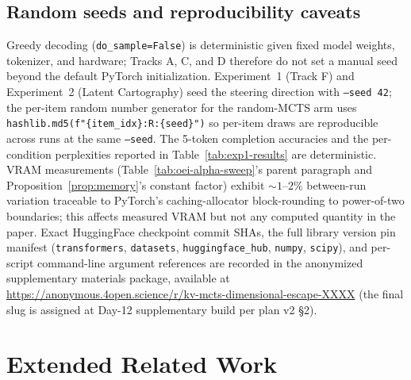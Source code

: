 \documentclass{article}
\begin{document}
\subsection{Random seeds and reproducibility caveats}
Greedy decoding (\texttt{do\_sample=False}) is deterministic given fixed model weights, tokenizer, and hardware; Tracks A, C, and D therefore do not set a manual seed beyond the default PyTorch initialization. Experiment~1 (Track F) and Experiment~2 (Latent Cartography) seed the steering direction with \texttt{--seed 42}; the per-item random number generator for the random-MCTS arm uses \texttt{hashlib.md5(f"\{item\_idx\}:R:\{seed\}")} so per-item draws are reproducible across runs at the same \texttt{--seed}. The 5-token completion accuracies and the per-condition perplexities reported in Table~\ref{tab:exp1-results} are deterministic. VRAM measurements (Table~\ref{tab:oei-alpha-sweep}'s parent paragraph and Proposition~\ref{prop:memory}'s constant factor) exhibit ${\sim}1$--$2\%$ between-run variation traceable to PyTorch's caching-allocator block-rounding to power-of-two boundaries; this affects measured VRAM but not any computed quantity in the paper. Exact HuggingFace checkpoint commit SHAs, the full library version pin manifest (\texttt{transformers}, \texttt{datasets}, \texttt{huggingface\_hub}, \texttt{numpy}, \texttt{scipy}), and per-script command-line argument references are recorded in the anonymized supplementary materials package, available at \url{https://anonymous.4open.science/r/kv-mcts-dimensional-escape-XXXX} (the final slug is assigned at Day-12 supplementary build per plan v2 §2).

\section{Extended Related Work}\label{sec:appendix-related-work}
\end{document}
